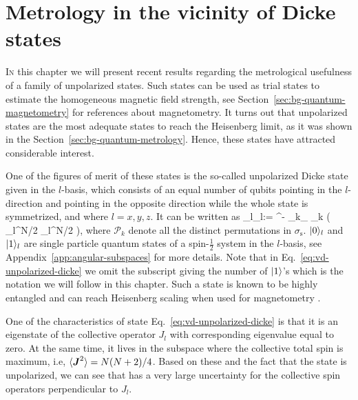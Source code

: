 \section{Metrology in the vicinity of Dicke states}

\label{sec:vd}


\lettrine[lines=2, findent=3pt,nindent=0pt]{I}{n} this chapter we will present recent results regarding the metrological usefulness of a family of unpolarized states.
Such states can be used as trial states to estimate the homogeneous magnetic field strength, see Section~\ref{sec:bg-quantum-magnetometry} for references about magnetometry.
It turns out that unpolarized states are the most adequate states to reach the Heisenberg limit, as it was shown in the Section~\ref{sec:bg-quantum-metrology}.
Hence, these states have attracted considerable interest.

One of the figures of merit of these states is the so-called unpolarized Dicke state \cite{Dicke1954} given in the $l$-basis, which consists of an equal number of qubits pointing in the $l$-direction and pointing in the opposite direction while the whole state is symmetrized, and where $l=x,y,z$.
It can be written as
\be
   _l\equiv {}_l:= ^{-}
  \sum_{k\in \sigma_}
  _{k} ( _l^{\otimes N/2} _l^{\otimes N/2} ),
  \label{eq:vd-unpolarized-dicke}
\ee
where $\mathcal{P}_k$ denote all the distinct permutations in $\sigma_\text{s}$.
$\vert{0}\rangle_l$ and $\vert{1}\rangle_l$ are single particle quantum states of a spin-$\frac{1}{2}$ system in the $l$-basis, see Appendix~\ref{app:angular-subspaces} for more details.
Note that in Eq.~\eqref{eq:vd-unpolarized-dicke} we omit the subscript giving the number of $\vert{1}\rangle$'s which is the notation we will follow in this chapter.
Such a state is known to be highly entangled \cite{Toth2007, Toth2009a} and can reach Heisenberg scaling when used for magnetometry \cite{Holland1993}.

One of the characteristics of state Eq.~\eqref{eq:vd-unpolarized-dicke} is that it is an eigenstate of the collective operator $J_l$ with corresponding eigenvalue equal to zero.
At the same time, it lives in the subspace where the collective total spin is maximum, i.e, $\langle{\ensuremath{\boldsymbol{J}}^2}\rangle=N(N+2)/4$.
Based on these and the fact that the state is unpolarized, we can see that has a very large uncertainty for the collective spin operators perpendicular to $J_l$.

